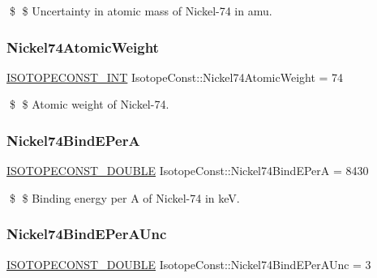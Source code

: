\$ \$ Uncertainty in atomic mass of Nickel-\/74 in amu. \mbox{\label{group___isotope_const-_nickel-_ni74_ga44732d13704e3a133ab1f23a3a9734a9}} 
\subsubsection{\texorpdfstring{Nickel74\+Atomic\+Weight}{Nickel74AtomicWeight}}
{\footnotesize\ttfamily \mbox{\hyperlink{group___isotope_const-_macros_ga5f18360b3e99483a35c32d789e62621c}{I\+S\+O\+T\+O\+P\+E\+C\+O\+N\+S\+T\+\_\+\+I\+NT}} Isotope\+Const\+::\+Nickel74\+Atomic\+Weight = 74}

\$ \$ Atomic weight of Nickel-\/74. \mbox{\label{group___isotope_const-_nickel-_ni74_ga5c9b53c0a5fafeb9fa44ea29411e8c59}} 
\subsubsection{\texorpdfstring{Nickel74\+Bind\+E\+PerA}{Nickel74BindEPerA}}
{\footnotesize\ttfamily \mbox{\hyperlink{group___isotope_const-_macros_ga8f45a7272ce02c0b4c65c44636ed719a}{I\+S\+O\+T\+O\+P\+E\+C\+O\+N\+S\+T\+\_\+\+D\+O\+U\+B\+LE}} Isotope\+Const\+::\+Nickel74\+Bind\+E\+PerA = 8430}

\$ \$ Binding energy per A of Nickel-\/74 in keV. \mbox{\label{group___isotope_const-_nickel-_ni74_gacd91e7ad1ac15311a4d50345d4d4bb84}} 
\subsubsection{\texorpdfstring{Nickel74\+Bind\+E\+Per\+A\+Unc}{Nickel74BindEPerAUnc}}
{\footnotesize\ttfamily \mbox{\hyperlink{group___isotope_const-_macros_ga8f45a7272ce02c0b4c65c44636ed719a}{I\+S\+O\+T\+O\+P\+E\+C\+O\+N\+S\+T\+\_\+\+D\+O\+U\+B\+LE}} Isotope\+Const\+::\+Nickel74\+Bind\+E\+Per\+A\+Unc = 3}

